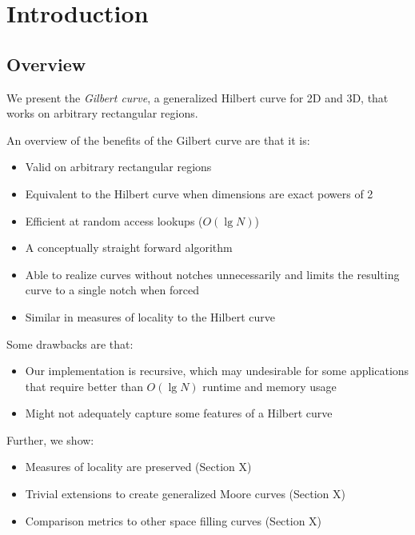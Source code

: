 \section{Introduction}

\subsection{Overview}

We present the \textit{Gilbert curve}, a generalized Hilbert curve for 2D and 3D,
that works on arbitrary rectangular regions.

An overview of the benefits of the Gilbert curve are that it is:

\begin{itemize}
  \item Valid on arbitrary rectangular regions
  \item Equivalent to the Hilbert curve when dimensions are exact powers of 2
  \item Efficient at random access lookups ($O(\lg N)$)
  \item A conceptually straight forward algorithm
  \item Able to realize curves without notches unnecessarily and limits the resulting curve
        to a single notch when forced
  \item Similar in measures of locality to the Hilbert curve
\end{itemize}

Some drawbacks are that:

\begin{itemize}
  \item Our implementation is recursive,
        which may undesirable for some applications that require better than $O( \lg N)$
        runtime and memory usage
  \item Might not adequately capture some features of a Hilbert curve
\end{itemize}

Further, we show:

\begin{itemize}
  \item Measures of locality are preserved (Section X)
  \item Trivial extensions to create generalized Moore curves (Section X)
  \item Comparison metrics to other space filling curves (Section X)
\end{itemize}


